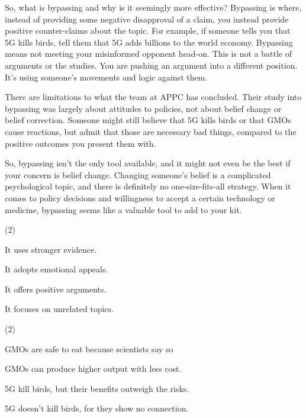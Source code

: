 \documentclass{英语试卷}
\begin{document}
\par So, what is bypassing and why is it seemingly more effective? Bypassing is where, instead of providing some negative disapproval of a claim, you instead provide positive counter-claims about the topic. For example, if someone tells you that 5G kills birds, tell them that 5G adds billions to the world economy. Bypassing means not meeting your misinformed opponent head-on. This is not a battle of arguments or the studies. You are pushing an argument into a different position. It's using someone's movements and logic against them.\par
\par There are limitations to what the team at APPC has concluded. Their study into bypassing was largely about attitudes to policies, not about belief change or belief correction. Someone might still believe that 5G kills birds or that GMOs cause reactions, but admit that those are necessary bad things, compared to the positive outcomes you present them with.\par
\par So, bypassing isn't the only tool available, and it might not even be the best if your concern is belief change. Changing someone's belief is a complicated psychological topic, and there is definitely no one-size-fits-all strategy. When it comes to policy decisions and willingness to accept a certain technology or medicine, bypassing seems like a valuable tool to add to your kit.\par
{}
\begin{choices}(2)
  \item It uses stronger evidence.
  \item It adopts emotional appeals.
  \item It offers positive arguments.
  \item It focuses on unrelated topics.
\end{choices}
\begin{choices}(2)
  \item GMOs are safe to eat because scientists say so
  \item GMOs can produce higher output with less cost.
  \item 5G kill birds, but their benefits outweigh the risks.
  \item 5G doesn't kill birds, for they show no connection.
\end{choices}
\end{document}
